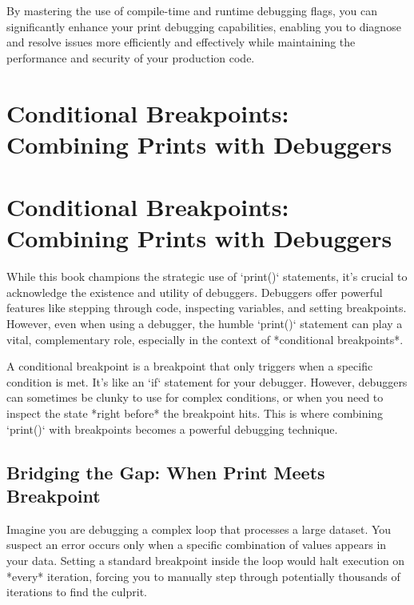 \documentclass{article}
\begin{document}
{{{By mastering the use of compile-time and runtime debugging flags, you can significantly enhance your print debugging capabilities, enabling you to diagnose and resolve issues more efficiently and effectively while maintaining the performance and security of your production code.

\newpage

\section*{Conditional Breakpoints: Combining Prints with Debuggers} %
\label{chapter-5-3-Conditional_Breakpoints__Combining_Print}

\section*{Conditional Breakpoints: Combining Prints with Debuggers}

While this book champions the strategic use of `print()` statements, it's crucial to acknowledge the existence and utility of debuggers. Debuggers offer powerful features like stepping through code, inspecting variables, and setting breakpoints. However, even when using a debugger, the humble `print()` statement can play a vital, complementary role, especially in the context of *conditional breakpoints*.

A conditional breakpoint is a breakpoint that only triggers when a specific condition is met. It's like an `if` statement for your debugger. However, debuggers can sometimes be clunky to use for complex conditions, or when you need to inspect the state *right before* the breakpoint hits. This is where combining `print()` with breakpoints becomes a powerful debugging technique.

\subsection*{Bridging the Gap: When Print Meets Breakpoint}

Imagine you are debugging a complex loop that processes a large dataset. You suspect an error occurs only when a specific combination of values appears in your data. Setting a standard breakpoint inside the loop would halt execution on *every* iteration, forcing you to manually step through potentially thousands of iterations to find the culprit.

}}}
\end{document}
